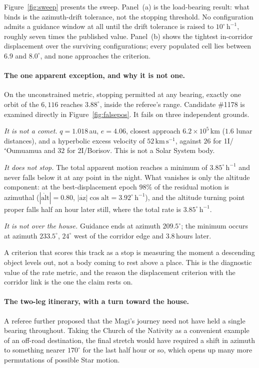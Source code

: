 \documentclass[11pt,a4paper]{article}
\begin{document}
Figure~\ref{fig:sweep} presents the sweep. Panel~(a) is the load-bearing
result: what binds is the azimuth-drift tolerance, not the stopping threshold.
No configuration admits a guidance window at all until the drift tolerance is
raised to $10^\circ\,\mathrm{h}^{-1}$, roughly seven times the published value.
Panel~(b) shows the tightest in-corridor displacement over the surviving
configurations; every populated cell lies between $6.9$ and $8.0^\circ$, and
none approaches the criterion.

\paragraph{The one apparent exception, and why it is not one.}
On the unconstrained metric, stopping permitted at any bearing, exactly one
orbit of the $6{,}116$ reaches $3.88^\circ$, inside the referee's range.
Candidate \#1178 is examined directly in Figure~\ref{fig:falsepos}. It fails on
three independent grounds.

\emph{It is not a comet.} $q = 1.018$\,au, $e = 4.06$, closest approach
$6.2\times10^{5}$\,km ($1.6$ lunar distances), and a hyperbolic excess velocity
of $52\,\mathrm{km\,s^{-1}}$, against $26$ for 1I/ʻOumuamua and $32$ for
2I/Borisov. This is not a Solar System body.

\emph{It does not stop.} The total apparent motion reaches a minimum of
$3.85^\circ\,\mathrm{h}^{-1}$ and never falls below it at any point in the
night. What vanishes is only the altitude component: at the best-displacement
epoch $98\%$ of the residual motion is azimuthal
($|\dot{\mathrm{alt}}| = 0.80$, $|\dot{\mathrm{az}}|\cos\mathrm{alt} = 3.92
^\circ\,\mathrm{h}^{-1}$), and the altitude turning point proper falls half an
hour later still, where the total rate is $3.85^\circ\,\mathrm{h}^{-1}$.

\emph{It is not over the house.} Guidance ends at azimuth $209.5^\circ$; the
minimum occurs at azimuth $233.5^\circ$, $24^\circ$ west of the corridor edge
and $3.8$\,hours later.

A criterion that scores this track as a stop is measuring the moment a
descending object levels out, not a body coming to rest above a place. This is
the diagnostic value of the rate metric, and the reason the displacement
criterion with the corridor link is the one the claim rests on.

\paragraph{The two-leg itinerary, with a turn toward the house.}
A referee further proposed that the Magi's journey need not have held a single
bearing throughout. Taking the Church of the Nativity as a convenient example
of an off-road destination, the final stretch would have required a shift in
azimuth to something nearer $170^\circ$ for the last half hour or so, which
opens up many more permutations of possible Star motion.
\end{document}
